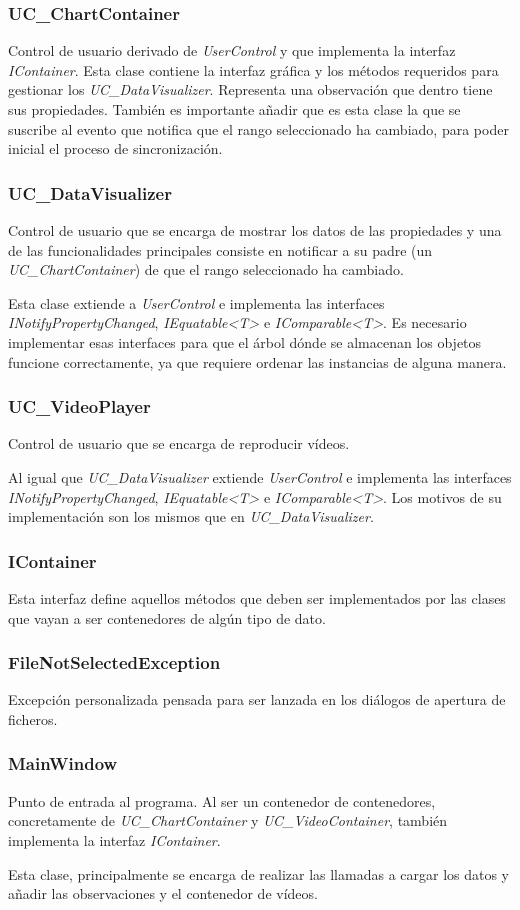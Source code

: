 \subsubsection{UC\_ChartContainer}
Control de usuario derivado de \emph{UserControl} y que implementa la interfaz
\emph{IContainer}. Esta clase contiene la interfaz gr\'afica y los m\'etodos requeridos para gestionar
los \emph{UC\_DataVisualizer}. Representa una observaci\'on que dentro tiene sus propiedades.
Tambi\'en es importante a\~nadir que es esta clase la que se suscribe al evento que notifica
que el rango seleccionado ha cambiado, para poder inicial el proceso de sincronizaci\'on.

\subsubsection{UC\_DataVisualizer}
Control de usuario que se encarga de mostrar los datos de las propiedades y una de las funcionalidades
principales consiste en notificar a su padre (un \emph{UC\_ChartContainer}) de que el rango seleccionado ha cambiado.

Esta clase extiende a \emph{UserControl} e implementa las interfaces \emph{INotifyPropertyChanged},
\emph{IEquatable<T>} e \emph{IComparable<T>}. Es necesario implementar
esas interfaces para que el \'arbol d\'onde se almacenan los objetos funcione correctamente, ya que 
requiere ordenar las instancias
de alguna manera. 

\subsubsection{UC\_VideoPlayer}
Control de usuario que se encarga de reproducir v\'ideos.

Al igual que \emph{UC\_DataVisualizer} extiende \emph{UserControl} 
e implementa las interfaces \emph{INotifyPropertyChanged},
\emph{IEquatable<T>} e \emph{IComparable<T>}. Los motivos de su implementaci\'on
son los mismos que en \emph{UC\_DataVisualizer}.

\subsubsection{IContainer}
Esta interfaz define aquellos m\'etodos que deben ser implementados por las clases que vayan a ser contenedores
de alg\'un tipo de dato.

\subsubsection{FileNotSelectedException}
Excepci\'on personalizada pensada para ser lanzada en los di\'alogos de apertura de ficheros.

\subsubsection{MainWindow}
Punto de entrada al programa. Al ser un contenedor de contenedores, concretamente de \emph{UC\_ChartContainer} y
\emph{UC\_VideoContainer}, tambi\'en implementa la interfaz \emph{IContainer}.

Esta clase, principalmente se encarga de realizar las llamadas a cargar los datos y añadir las observaciones
y el contenedor de v\'ideos.